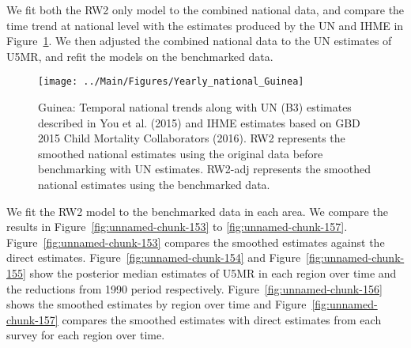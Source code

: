 \documentclass[12pt]{article}\usepackage[]{graphicx}\usepackage[]{color}
\newenvironment{knitrout}{}{} %
\begin{document}
We fit both the RW2 only model to the combined national data, and compare the time trend at national level with the estimates produced by the UN and IHME in Figure~\ref{fig:unnamed-chunk-152}. We then adjusted the combined national data to the UN estimates of U5MR, and refit the models on the benchmarked data. 

\begin{knitrout}
\color{fgcolor}\begin{figure}[bht]

{\centering \texttt{[image: ../Main/Figures/Yearly\_national\_Guinea]} 

}

\caption[Guinea]{Guinea: Temporal national trends along with UN (B3) estimates described in You et al. (2015) and IHME estimates based on GBD 2015 Child Mortality Collaborators (2016). RW2 represents the smoothed national estimates using the original data before benchmarking with UN estimates. RW2-adj represents the smoothed national estimates using the benchmarked data.}\label{fig:unnamed-chunk-152}
\end{figure}


\end{knitrout}
 

We fit the RW2 model to the benchmarked data in each area. 
We compare the results in Figure~\ref{fig:unnamed-chunk-153} to \ref{fig:unnamed-chunk-157}.
Figure~\ref{fig:unnamed-chunk-153} compares the smoothed estimates against the direct estimates. Figure~\ref{fig:unnamed-chunk-154} and Figure~\ref{fig:unnamed-chunk-155} show the posterior median estimates of U5MR in each region over time and the reductions from 1990 period respectively.
Figure~\ref{fig:unnamed-chunk-156} shows the smoothed estimates by region over time and Figure~\ref{fig:unnamed-chunk-157} compares the smoothed estimates with direct estimates from each survey for each region over time.




\end{document}
